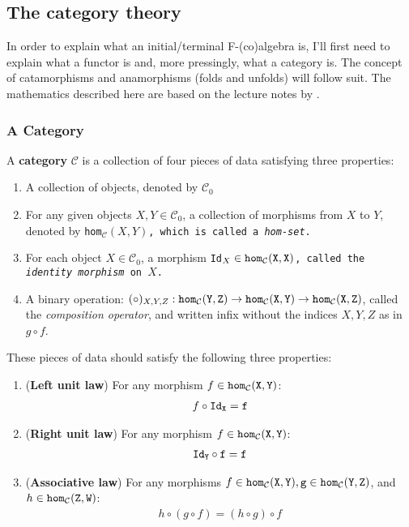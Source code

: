 \subsection{The category theory}\label{sec:cat_theory}
In order to explain what an initial/terminal F-(co)algebra is, I'll first need to explain what a functor is and, more pressingly, what a category is.
The concept of catamorphisms and anamorphisms (folds and unfolds) will follow suit.
The mathematics described here are based on the lecture notes by \cite{Ahrens2022}.

\subsubsection{A Category}
A \textbf{category} $\mathcal{C}$ is a collection of four pieces of data satisfying three properties:
\newcommand{\homm}[2]{\tt{hom}_\mathcal{#1}(#2)}
\begin{enumerate}
    \item A collection of objects, denoted by $\mathcal{C}_0$
    \item For any given objects $X,Y \in \mathcal{C}_0$, a collection of morphisms from $X$ to $Y$, denoted by \tt{hom}$_\mathcal{C}(X,Y)$, which is called a \textit{hom-set}.
    \item For each object $X\in \mathcal{C}_0$, a morphism \tt{Id}$_X\in\homm{C}{X,X}$, called the \textit{identity morphism} on $X$.
    \item A binary operation: $(\circ)_{X,Y,Z}: \homm{C}{Y,Z}\to\homm{C}{X,Y}\to\homm{C}{X,Z}$, called the \textit{composition operator}, and written infix without the indices $X,Y,Z$ as in $g \circ f$.
\end{enumerate}
These pieces of data should satisfy the following three properties:
\begin{enumerate}
    \item (\textbf{Left unit law}) For any morphism $f\in\homm{C}{X,Y}$: \begin{align*} f\circ \tt{Id}_X = f \end{align*}
    \item (\textbf{Right unit law}) For any morphism $f\in\homm{C}{X,Y}$: \begin{align*} \tt{Id}_Y\circ f = f \end{align*}
    \item (\textbf{Associative law}) For any morphisms $f\in\homm{C}{X,Y},g\in\homm{C}{Y,Z}$, and $h\in\homm{C}{Z,W}$: \begin{align*} h\circ(g\circ f)=(h\circ g)\circ f \end{align*}
\end{enumerate}

